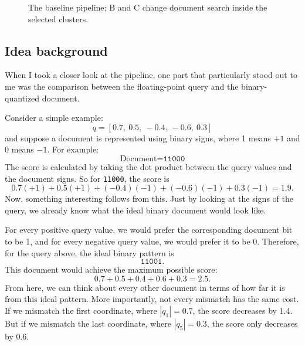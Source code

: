 \begin{figure}[H]\centering
{}
\caption{The baseline pipeline; B and C change document search inside the selected clusters.}
\end{figure}

\subsection{Idea background}
When I took a closer look at the pipeline, one part that particularly stood out to me was
the comparison between the floating-point query and the binary-quantized document.

Consider a simple example:
\[
q=[0.7,\ 0.5,\ -0.4,\ -0.6,\ 0.3]
\]
and suppose a document is represented using binary signs, where 1 means $+1$ and 0 means $-1$.
For example:
\[
\text{Document}=\texttt{11000}
\]
The score is calculated by taking the dot product between the query values and the document
signs. So for \texttt{11000}, the score is
\[
0.7(+1)+0.5(+1)+(-0.4)(-1)+(-0.6)(-1)+0.3(-1)=1.9.
\]
Now, something interesting follows from this. Just by looking at the signs of the query,
we already know what the ideal binary document would look like.

For every positive query value, we would prefer the corresponding document bit to be 1,
and for every negative query value, we would prefer it to be 0. Therefore, for the query
above, the ideal binary pattern is
\[
\texttt{11001}.
\]
This document would achieve the maximum possible score:
\[
0.7+0.5+0.4+0.6+0.3=2.5.
\]
From here, we can think about every other document in terms of how far it is from this ideal
pattern. More importantly, not every mismatch has the same cost. If we mismatch the first
coordinate, where $|q_1|=0.7$, the score decreases by 1.4. But if we mismatch the last
coordinate, where $|q_5|=0.3$, the score only decreases by 0.6.

